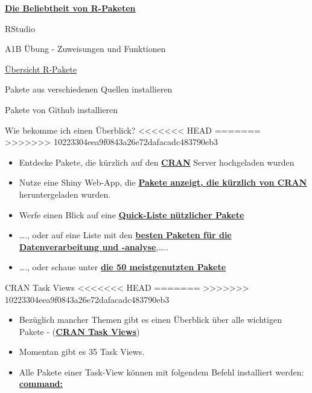 \documentclass[ignorenonframetext,]{beamer}
\providecommand{\tightlist}{%
  \setlength{\itemsep}{0pt}\setlength{\parskip}{0pt}}
\begin{document}
\begin{frame}{\href{https://gallery.shinyapps.io/cran-gauge/}{\textbf{Die
Beliebtheit von R-Paketen}}}
\begin{frame}{RStudio}
\begin{frame}[fragile]{A1B Übung - Zuweisungen und Funktionen}
\begin{frame}{\href{https://www.youtube.com/watch?v=kKI9--Opmso}{Übersicht
R-Pakete}}
\begin{frame}[fragile]{Pakete aus verschiedenen Quellen installieren}
\begin{block}{Pakete von Github installieren}
\end{block}

\end{frame}

\begin{frame}{Wie bekomme ich einen Überblick?}
<<<<<<< HEAD
=======
\protect\hypertarget{wie-bekomme-ich-einen-uberblick}{}
>>>>>>> 10223304eea9f0843a26e72dafacadc483790eb3

\begin{itemize}
\item
  Entdecke Pakete, die kürzlich auf den
  \href{https://mran.microsoft.com/packages/}{\textbf{CRAN}} Server
  hochgeladen wurden
\item
  Nutze eine Shiny Web-App, die
  \href{https://gallery.shinyapps.io/cran-gauge/}{\textbf{Pakete
  anzeigt, die kürzlich von CRAN}} heruntergeladen wurden.
\item
  Werfe einen Blick auf eine
  \href{https://support.rstudio.com/hc/en-us/articles/201057987-Quick-list-of-useful-R-packages}{\textbf{Quick-Liste
  nützlicher Pakete}}
\item
  \ldots{}., oder auf eine Liste mit den
  \href{http://www.computerworld.com/article/2921176/business-intelligence/great-r-packages-for-data-import-wrangling-visualization.html}{\textbf{besten
  Paketen für die Datenverarbeitung und -analyse}},\ldots{}..
\item
  \ldots{}., oder schaue unter
  \href{https://www.r-bloggers.com/the-50-most-used-r-packages/}{\textbf{die
  50 meistgenutzten Pakete}}
\end{itemize}

\end{frame}

\begin{frame}[fragile]{CRAN Task Views}
<<<<<<< HEAD
=======
\protect\hypertarget{cran-task-views}{}
>>>>>>> 10223304eea9f0843a26e72dafacadc483790eb3

\begin{itemize}
\tightlist
\item
  Bezüglich mancher Themen gibt es einen Überblick über alle wichtigen
  Pakete - (\href{https://cran.r-project.org/web/views/}{\textbf{CRAN
  Task Views}})
\item
  Momentan gibt es 35 Task Views.
\item
  Alle Pakete einer Task-View können mit folgendem Befehl installiert
  werden:
  \href{https://mran.microsoft.com/rpackages/}{\textbf{command:}}
\end{itemize}


\end{frame}
\end{frame}
\end{frame}
\end{frame}
\end{frame}
\end{document}
